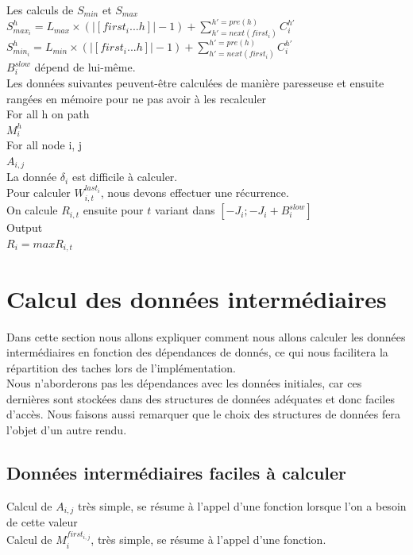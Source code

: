 \documentclass[10pt,a4paper]{article}
\begin{document}
Les calculs de $S_{min}$ et $S_{max}$\\
$S_{max_i}^h = L_{max} \times (|[first_i ... h]| - 1) + \sum 
\limits_{h'=next(first_i)}^{h'=pre(h)}C_i^{h'}$ \\
$S_{min_i}^h = L_{min} \times (|[first_i ... h]| - 1) + \sum 
\limits_{h'=next(first_i)}^{h'=pre(h)}C_i^{h'}$ \\
$B_{i}^{slow}$ dépend de lui-même.\\

Les données suivantes peuvent-être calculées de manière paresseuse et ensuite rangées en mémoire pour ne pas avoir à les recalculer\\
For all h on path\\
$M_i^{h}$\\
For all node i, j\\
$A_{i,j}$\\

La donnée $\delta_i$ est difficile à calculer.\\
Pour calculer $W_{i,t}^{last_i}$, nous devons effectuer une récurrence.\\
On calcule $R_{i,t}$ ensuite pour $t$ variant dans $[-J_i;-J_i+B_i^{slow}]$\\

Output\\
$R_{i} = max R_{i,t}$\\



\section{Calcul des données intermédiaires}
Dans cette section nous allons expliquer comment nous allons calculer les données 
intermédiaires en fonction des dépendances de donnés, ce qui nous facilitera la répartition 
des taches lors de l'implémentation.\\
Nous n'aborderons pas les dépendances avec les données initiales, car ces dernières sont stockées 
dans des structures de données adéquates et donc faciles d'accès.
Nous faisons aussi remarquer que le choix des structures de données fera 
l'objet d'un autre rendu.

\subsection{Données intermédiaires faciles à calculer}
Calcul de $A_{i,j}$ très simple, se résume à l'appel d'une fonction lorsque l'on a besoin de 
cette valeur\\
Calcul de $M_{i}^{first_{i,j}}$, très simple, se résume à l'appel d'une fonction.
\end{document}
